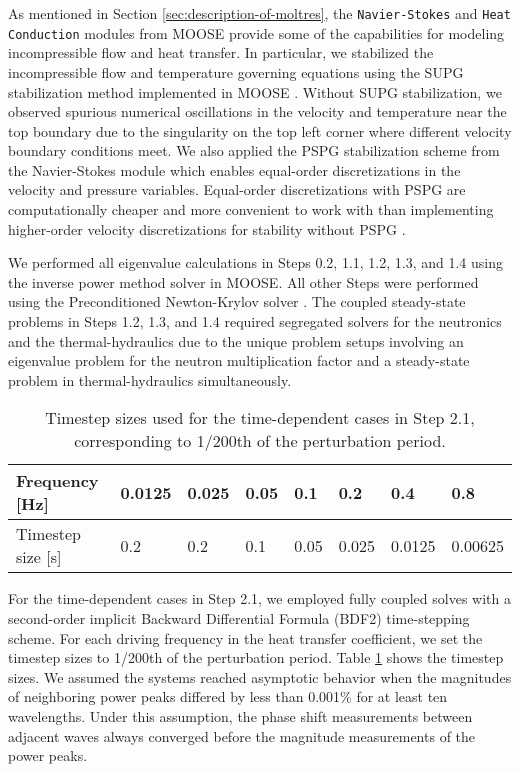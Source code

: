 As mentioned in Section \ref{sec:description-of-moltres}, the
\texttt{Navier-Stokes} and \texttt{Heat} \texttt{Conduction} modules from \gls{MOOSE}
provide some of the capabilities for
modeling incompressible flow and heat transfer. In particular, we stabilized
the incompressible flow and temperature governing equations using the
\gls{SUPG} stabilization method implemented in \gls{MOOSE}
\cite{peterson_overview_2018}. Without \gls{SUPG} stabilization, we
observed spurious numerical oscillations in the velocity and temperature near
the top boundary due to the singularity on the top left corner where different
velocity boundary conditions meet. We also applied the \gls{PSPG} stabilization
scheme \cite{hughes_new_1986} from the Navier-Stokes module
\cite{peterson_overview_2018}
which enables equal-order discretizations in the velocity and pressure
variables. Equal-order discretizations with \gls{PSPG} are computationally
cheaper and more convenient to work with than implementing higher-order
velocity discretizations for stability without \gls{PSPG}
\cite{chapelle_inf-sup_1993}.

We performed all eigenvalue calculations in Steps 0.2, 1.1, 1.2, 1.3, and 1.4
using the inverse power method solver in \gls{MOOSE}. All other Steps
were performed using the Preconditioned Newton-Krylov solver
\cite{gaston_physics-based_2015}. The coupled steady-state problems in
Steps 1.2, 1.3, and 1.4 required segregated solvers for the neutronics
and the thermal-hydraulics due to the unique problem
setups involving an eigenvalue problem for the neutron multiplication factor
and a steady-state problem in thermal-hydraulics simultaneously.

\begin{table}[tb]
    \caption{Timestep sizes used for the time-dependent cases in
    Step 2.1, corresponding to 1/200th of the perturbation period.}
	\centering
	\setlength\tabcolsep{2.5pt}
	\begin{tabular}{l l l l l l l l}
	    \toprule
	    Frequency [Hz] & 0.0125 & 0.025 & 0.05 & 0.1 & 0.2 & 0.4 & 0.8 \\
	    \midrule
	    Timestep size [s] & 0.2 & 0.2 & 0.1 & 0.05 & 0.025 & 0.0125 & 0.00625
	    \\
	    \bottomrule
	\end{tabular}
	\label{table:timestep}
\end{table}

For the time-dependent cases in Step 2.1, we employed fully coupled solves with
a second-order implicit Backward Differential Formula (BDF2) time-stepping
scheme. For each driving frequency in the heat transfer coefficient, we set the
timestep sizes to 1/200th of the perturbation period. Table
\ref{table:timestep} shows the timestep sizes. We assumed the
systems reached asymptotic behavior when the magnitudes of neighboring power
peaks differed by less than 0.001\% for at least ten wavelengths. Under this
assumption, the phase shift measurements between adjacent waves always
converged before the magnitude measurements of the power peaks.

